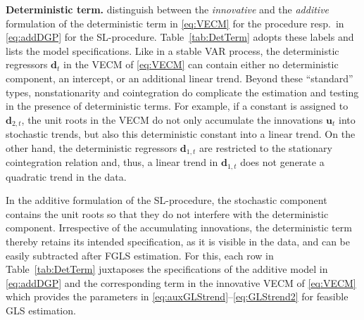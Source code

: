 \textbf{Deterministic term.} \citet{JohansenNielsen2018} distinguish between the \textit{innovative} and the \textit{additive} formulation of the deterministic term in \eqref{eq:VECM} for the \citeauthor{Johansen1996} procedure resp.~in \eqref{eq:addDGP} for the SL-procedure. Table~\ref{tab:DetTerm} adopts these labels and lists the model specifications. Like in a stable VAR process, the deterministic regressors $\boldsymbol{d}_t $ in the VECM of \eqref{eq:VECM} can contain either no deterministic component, an intercept, or an additional linear trend. Beyond these ``standard'' types, nonstationarity and cointegration do complicate the estimation and testing in the presence of deterministic terms. For example, if a constant is assigned to $ \boldsymbol{d}_{2,t} $, the unit roots in the VECM do not only accumulate the innovations $ \boldsymbol{u}_t $ into stochastic trends, but also this deterministic constant into a linear trend. On the other hand, the deterministic regressors $ \boldsymbol{d}_{1,t} $ are restricted to the stationary cointegration relation and, thus, a linear trend in $ \boldsymbol{d}_{1,t} $ does not generate a quadratic trend in the data. 
\begin{table}[ht]	%
	\centering
	\caption{Verified specifications of the deterministic term.}
	\resizebox{\textwidth}{!}{
		}
	\label{tab:DetTerm}		
\end{table}
In the additive formulation of the SL-procedure, the stochastic component contains the unit roots so that they do not interfere with the deterministic component. Irrespective of the accumulating innovations, the deterministic term thereby retains its intended specification, as it is visible in the data, and can be easily subtracted after FGLS estimation. For this, each row in Table~\ref{tab:DetTerm} juxtaposes the specifications of the additive model in \eqref{eq:addDGP} and the corresponding term in the innovative VECM of \eqref{eq:VECM} which provides the parameters in \eqref{eq:auxGLStrend}--\eqref{eq:GLStrend2} for feasible GLS estimation.

